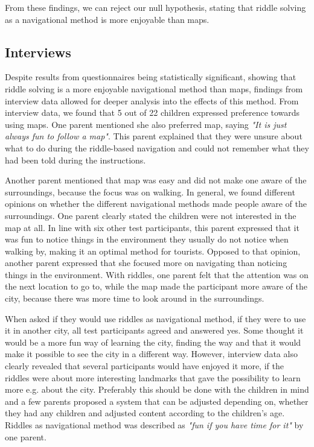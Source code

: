 From these findings, we can reject our null hypothesis, stating that riddle solving as a navigational method is more enjoyable than maps.

\subsection{Interviews}
Despite results from questionnaires being statistically significant, showing that riddle solving is a more enjoyable navigational method than maps, findings from interview data allowed for deeper analysis into the effects of this method. From interview data, we found that 5 out of 22 children expressed preference towards using maps. One parent mentioned she also preferred map, saying \textit{"It is just always fun to follow a map"}. This parent explained that they were unsure about what to do during the riddle-based navigation and could not remember what they had been told during the instructions. 

Another parent mentioned that map was easy and did not make one aware of the surroundings, because the focus was on walking. In general, we found different opinions on whether the different navigational methods made people aware of the surroundings. One parent clearly stated the children were not interested in the map at all. In line with six other test participants, this parent expressed that it was fun to notice things in the environment they usually do not notice when walking by, making it an optimal method for tourists. Opposed to that opinion, another parent expressed that she focused more on navigating than noticing things in the environment. With riddles, one parent felt that the attention was on the next location to go to, while the map made the participant more aware of the city, because there was more time to look around in the surroundings. 

When asked if they would use riddles as navigational method, if they were to use it in another city, all test participants agreed and answered yes. Some thought it would be a more fun way of learning the city, finding the way and that it would make it possible to see the city in a different way. However, interview data also clearly revealed that several participants would have enjoyed it more, if the riddles were about more interesting landmarks that gave the possibility to learn more e.g. about the city. Preferably this should be done with the children in mind and a few parents proposed a system that can be adjusted depending on, whether they had any children and adjusted content according to the children’s age. Riddles as navigational method was described as \textit{"fun if you have time for it"} by one parent. 

